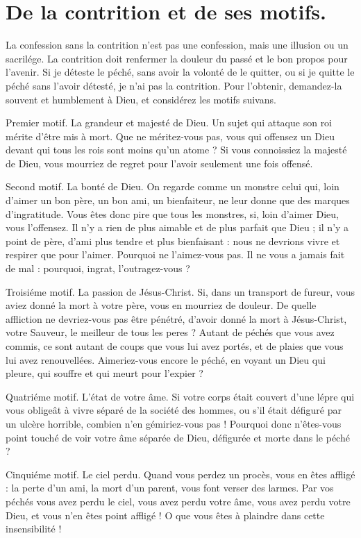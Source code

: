 \documentclass[instructions.tex]{subfiles}
\begin{document}
 
\chapter{De la contrition et de ses motifs.}
 
\primo La confession sans la contrition n'est pas une confession, mais une illusion ou un sacrilége. La contrition doit renfermer la douleur du passé et le bon propos pour l'avenir. Si je déteste le péché, sans avoir la volonté de le quitter, ou si je quitte le péché sans l'avoir détesté, je n'ai pas la contrition. Pour l'obtenir, demandez-la souvent et humblement à Dieu, et considérez les motifs suivans.

Premier motif. La grandeur et majesté de Dieu. Un sujet qui attaque son roi mérite d'être mis à mort. Que ne méritez-vous pas, vous qui offensez un Dieu devant qui tous les rois sont moins qu'un atome ? Si vous connoissiez la majesté de Dieu, vous mourriez de regret pour l'avoir seulement une fois offensé.

Second motif. La bonté de Dieu. On regarde comme un monstre celui qui, loin d'aimer un bon père, un bon ami, un bienfaiteur, ne leur donne que des marques d'ingratitude. Vous êtes donc pire que tous les monstres, si, loin d'aimer Dieu, vous l'offensez. Il n'y a rien de plus aimable et de plus parfait que Dieu ; il n'y a point de père, d'ami plus tendre et plus bienfaisant : nous ne devrions vivre et respirer que pour l'aimer. Pourquoi ne l'aimez-vous pas. Il ne vous a jamais fait de mal : pourquoi, ingrat, l'outragez-vous ?

Troisiéme motif. La passion de Jésus-Christ. Si, dans un transport de fureur, vous aviez donné la mort à votre père, vous en mourriez de douleur. De quelle affliction ne devriez-vous pas être pénétré, d'avoir donné la mort à Jésus-Christ, votre Sauveur, le meilleur de tous les peres ? Autant de péchés que vous avez commis, ce sont autant de coups que vous lui avez portés, et de plaies que vous lui avez renouvellées. Aimeriez-vous encore le péché, en voyant un Dieu qui pleure, qui souffre et qui meurt pour l'expier ?

Quatriéme motif. L'état de votre âme. Si votre corps était couvert d'une lépre qui vous obligeât à vivre séparé de la société des hommes, ou s'il était défiguré par un ulcère horrible, combien n'en gémiriez-vous pas ! Pourquoi donc n'êtes-vous point touché de voir votre âme séparée de Dieu, défigurée et morte dans le péché ?

Cinquiéme motif. Le ciel perdu. Quand vous perdez un procès, vous en êtes affligé : la perte d'un ami, la mort d'un parent, vous font verser des larmes. Par vos péchés vous avez perdu le ciel, vous avez perdu votre âme, vous avez perdu votre Dieu, et vous n'en êtes point affligé ! O que vous êtes à plaindre dans cette insensibilité !
\end{document}

